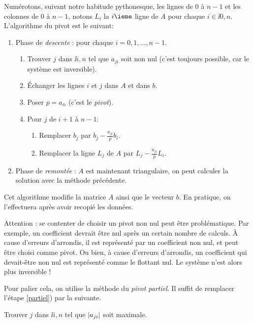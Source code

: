 Numérotons, suivant notre habitude pythonesque, les lignes de $0$ à $n-1$ et les colonnes de $0$ à
$n-1$, notons $L_{i}$ la $i\ieme$ ligne  de $A$ pour chaque $i\in\ii{0,n}$.
L'algorithme du pivot est le suivant:
\begin{enumerate}
\item Phase de \emph{descente} : pour chaque $i=0, 1, \ldots, n-1$.
  \begin{enumerate}
  \item\label{partiel} Trouver $j$ dans $\ii{i, n}$ tel que $a_{ji}$ soit non nul (c'est toujours 
possible, car le système est inversible).
  \item Échanger les lignes $i$ et $j$ dans $A$ et dans $b$.
  \item Poser $p = a_{ii}$ (c'est le \emph{pivot}).
  \item Pour $j$ de $i+1$ à $n-1$:
    \begin{enumerate}
    \item Remplacer $b_{j}$ par $b_{j}-\frac{a_{ji}}{p}b_{i}$.
    \item Remplacer la ligne $L_{j}$ de $A$ par $L_{j} - \frac{a_{ji}}{p}L_{i}$.
    \end{enumerate}
  \end{enumerate}
\item Phase de \emph{remontée} : $A$ est maintenant triangulaire, on peut calculer la solution avec la méthode précédente.
\end{enumerate}

\begin{rem}
  Cet algorithme modifie la matrice $A$ ainsi que le vecteur $b$. En pratique, on l'effectuera après avoir recopié les données. 
\end{rem}



Attention : se contenter de choisir un pivot non nul peut être problématique.
Par exemple, un 
coefficient devrait être nul après un certain nombre de calculs. 
À cause d'erreurs d'arrondis, il 
est représenté par un coefficient non nul, et peut être choisi comme pivot. 
Ou bien, à cause d'erreurs d'arrondis, un coefficient qui devait-être non nul est représenté comme le flottant nul. 
Le système n'est alors plus inversible ! 

Pour palier cela, on utilise la méthode du \emph{pivot partiel}. 
Il suffit de remplacer l'étape \ref{partiel}) par la suivante. 
\begin{center}
Trouver $j$ dans $\ii{i, n}$ tel que $\left|a_{ji}\right|$ soit maximale.
\end{center}


